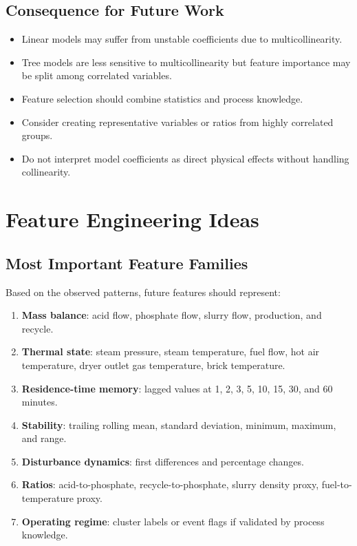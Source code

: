 \documentclass[11pt,a4paper]{article}
\begin{document}
\subsection{Consequence for Future Work}

\begin{itemize}
    \item Linear models may suffer from unstable coefficients due to multicollinearity.
    \item Tree models are less sensitive to multicollinearity but feature importance may be split among correlated variables.
    \item Feature selection should combine statistics and process knowledge.
    \item Consider creating representative variables or ratios from highly correlated groups.
    \item Do not interpret model coefficients as direct physical effects without handling collinearity.
\end{itemize}

\section{Feature Engineering Ideas}

\subsection{Most Important Feature Families}

Based on the observed patterns, future features should represent:

\begin{enumerate}
    \item \textbf{Mass balance}: acid flow, phosphate flow, slurry flow, production, and recycle.
    \item \textbf{Thermal state}: steam pressure, steam temperature, fuel flow, hot air temperature, dryer outlet gas temperature, brick temperature.
    \item \textbf{Residence-time memory}: lagged values at 1, 2, 3, 5, 10, 15, 30, and 60 minutes.
    \item \textbf{Stability}: trailing rolling mean, standard deviation, minimum, maximum, and range.
    \item \textbf{Disturbance dynamics}: first differences and percentage changes.
    \item \textbf{Ratios}: acid-to-phosphate, recycle-to-phosphate, slurry density proxy, fuel-to-temperature proxy.
    \item \textbf{Operating regime}: cluster labels or event flags if validated by process knowledge.
\end{enumerate}
\end{document}
